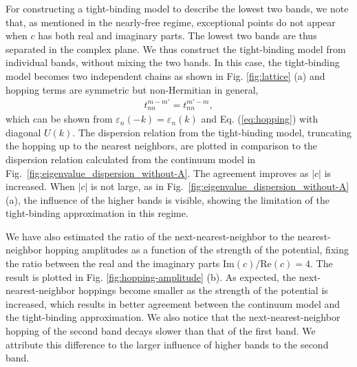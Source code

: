 \documentclass[prb,superscriptaddress,floatfix,twocolumn,showpacs]{revtex4-2}
\begin{document}
For constructing a tight-binding model to describe the lowest two bands, we note that, as mentioned in the nearly-free regime, exceptional points do not appear when $c$ has both real and imaginary parts. 
The lowest two bands are thus separated in the complex plane. 
We thus construct the tight-binding model from individual bands, without mixing the two bands. 
In this case, the tight-binding model becomes two independent chains as shown in Fig. \ref{fig:lattice} (a) and hopping terms are symmetric but non-Hermitian in general,
\begin{align}
    t_{nn}^{m-m'}=t_{nn}^{m'-m},
    \label{eq:hopping_symmetric}
\end{align}
which can be shown from $\varepsilon_n(-k)=\varepsilon_n(k)$ and Eq. (\ref{eq:hopping}) with diagonal $U(k)$. 
The dispersion relation from the tight-binding model, truncating the hopping up to the nearest neighbors, are plotted in comparison to the dispersion relation calculated from the continuum model in Fig.~\ref{fig:eigenvalue_dispersion_without-A}. 
The agreement improves as $|c|$ is increased. When $|c|$ is not large, as in Fig.~\ref{fig:eigenvalue_dispersion_without-A} (a), the influence of the higher bands is visible, showing the limitation of the tight-binding approximation in this regime.

We have also estimated the ratio of the next-nearest-neighbor to the nearest-neighbor hopping amplitudes as a function of the strength of the potential, fixing the ratio between the real and the imaginary parts $\mathrm{Im}(c)/\mathrm{Re}(c) = 4$.
The result is plotted in Fig. \ref{fig:hopping-amplitude} (b).
As expected, the next-nearest-neighbor hoppings become smaller as the strength of the potential is increased, which results in better agreement between the continuum model and the tight-binding approximation. We also notice that the next-nearest-neighbor hopping of the second band decays slower than that of the first band. 
We attribute this difference to the larger influence of higher bands to the second band. 
\end{document}
